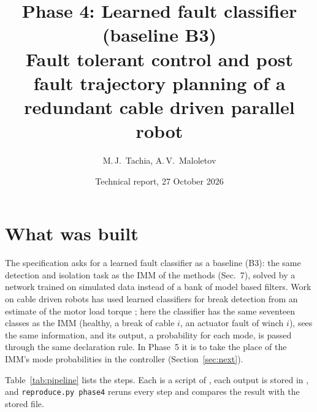 \documentclass[10pt]{article}
\title{Phase 4: Learned fault classifier (baseline B3)\\[2pt]
\large Fault tolerant control and post fault trajectory planning of a redundant cable driven parallel robot}
\author{M.\,J.\ Tachia, A.\,V.\ Maloletov}
\date{Technical report, 27 October 2026}
\begin{document}
\maketitle

\noindent{}

\section{What was built}\label{sec:overview}

The specification asks for a learned fault classifier as a baseline (B3): the same detection and isolation task as the IMM of the methods (Sec.~7), solved by a network trained on simulated data instead of a bank of model based filters. Work on cable driven robots has used learned classifiers for break detection from an estimate of the motor load torque \citep{bettega2025load}; here the classifier has the same seventeen classes as the IMM (healthy, a break of cable $i$, an actuator fault of winch $i$), sees the same information, and its output, a probability for each mode, is passed through the same declaration rule. In Phase~5 it is to take the place of the IMM's mode probabilities in the controller (Section~\ref{sec:next}).

Table~\ref{tab:pipeline} lists the steps. Each is a script of , each output is stored in , and \texttt{reproduce.py phase4} reruns every step and compares the result with the stored file.
\end{document}

